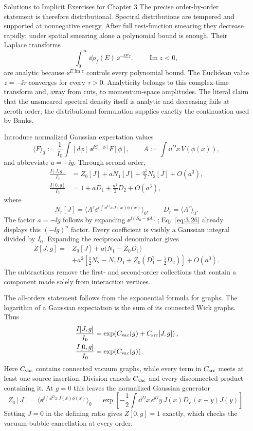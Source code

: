 \begin{bankssolutions}{Solutions to Implicit Exercises for Chapter 3}
The precise order-by-order statement is therefore distributional.  Spectral
distributions are tempered and supported at nonnegative energy.  After full
test-function smearing they decrease rapidly; under spatial smearing alone a
polynomial bound is enough.  Their Laplace transforms
\[
 \int_0^\infty\dd\rho_f(E)\,\ee^{-\ii Ez},
 \qquad \operatorname{Im}z<0,
\]
are analytic because $\ee^{E\operatorname{Im}z}$ controls every polynomial
bound.  The Euclidean value $z=-\ii\tau$ converges for every $\tau>0$.
Analyticity belongs to this complex-time transform and, away from cuts, to
momentum-space amplitudes.  The literal claim that the unsmeared spectral
density itself is analytic and decreasing fails at zeroth order; the
distributional formulation supplies exactly the continuation used by Banks.

Introduce normalized Gaussian expectation values
\[
 \langle F\rangle_0:=\frac{1}{I_0}
 \int[d\phi]\,\ee^{\ii S_0[\phi]}F[\phi],
 \qquad A:=\int\dd^D x\,V(\phi(x)),
\]
and abbreviate $a=-\ii g$.  Through second order,
\begin{align*}
 \frac{I[J,g]}{I_0}
 &=Z_0[J]+aN_1[J]+\frac{a^2}{2}N_2[J]+O(a^3),\\
 \frac{I[0,g]}{I_0}
 &=1+aD_1+\frac{a^2}{2}D_2+O(a^3),
\end{align*}
where
\[
 N_r[J]=\langle A^r\ee^{\ii\int\dd^D x\,J(x)\phi(x)}\rangle_0,
 \qquad D_r=\langle A^r\rangle_0.
\]
The factor $a=-\ii g$ follows by expanding
$\ee^{\ii(S_0-gA)}$; Eq.~\eqref{eq:3.26} already displays this
$(-\ii g)^n$ factor.
Every coefficient is visibly a Gaussian integral divided by $I_0$.  Expanding
the reciprocal denominator gives
\begin{align*}
 Z[J,g]={}&Z_0[J]+a\bigl(N_1-Z_0D_1\bigr)\\
 &+a^2\left[\frac12N_2-N_1D_1
 +Z_0\left(D_1^2-\frac12D_2\right)\right]+O(a^3).
\end{align*}
The subtractions remove the first- and second-order collections that contain
a component made solely from interaction vertices.

The all-orders statement follows from the exponential formula for graphs.
The logarithm of a Gaussian expectation is the sum of its connected Wick
graphs.  Thus
\begin{align*}
 \frac{I[J,g]}{I_0}
 &=\exp\!\left(C_{\rm vac}(g)+C_{\rm src}[J,g]\right),\\
 \frac{I[0,g]}{I_0}&=\exp\!\left(C_{\rm vac}(g)\right).
\end{align*}
Here $C_{\rm vac}$ contains connected vacuum graphs, while every term in
$C_{\rm src}$ meets at least one source insertion.  Division cancels
$C_{\rm vac}$ and every disconnected product containing it.  At $g=0$ this
leaves the normalized Gaussian generator
\[
 Z_0[J]=\langle\ee^{\ii\int\dd^D x\,J(x)\phi(x)}\rangle_0
 =\exp\!\left[-\frac12\int\dd^D x\,\dd^D y\,
 J(x)D_F(x-y)J(y)\right].
\]
Setting $J=0$ in the defining ratio gives $Z[0,g]=1$ exactly, which checks the
vacuum-bubble cancellation at every order.


\end{bankssolutions}
